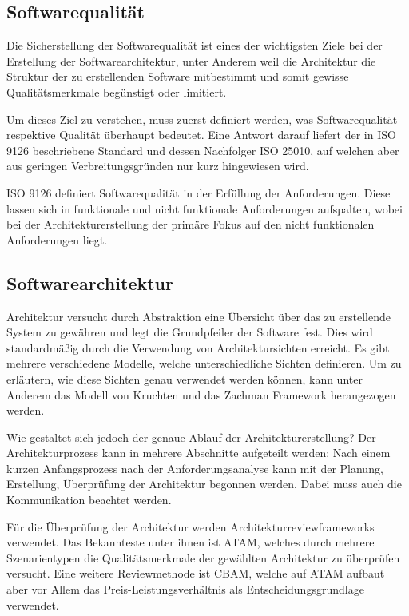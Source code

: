 \subsection{Softwarequalität}
Die Sicherstellung der Softwarequalität ist eines der wichtigsten Ziele bei der Erstellung der Softwarearchitektur, unter Anderem weil die Architektur die Struktur der zu erstellenden Software mitbestimmt und somit gewisse Qualitätsmerkmale begünstigt oder limitiert.

Um dieses Ziel zu verstehen, muss zuerst definiert werden, was Softwarequalität respektive Qualität überhaupt bedeutet. Eine Antwort darauf liefert der in ISO 9126 beschriebene Standard und dessen Nachfolger ISO 25010, auf welchen aber aus geringen Verbreitungsgründen nur kurz hingewiesen wird.

ISO 9126 definiert Softwarequalität in der Erfüllung der Anforderungen. Diese lassen sich in funktionale und nicht funktionale Anforderungen aufspalten, wobei bei der Architekturerstellung der primäre Fokus auf den nicht funktionalen Anforderungen liegt.

\subsection{Softwarearchitektur}
Architektur versucht durch Abstraktion eine Übersicht über das zu erstellende System zu gewähren und legt die Grundpfeiler der Software fest. Dies wird standardmäßig durch die Verwendung von Architektursichten erreicht. Es gibt mehrere verschiedene Modelle, welche unterschiedliche Sichten definieren. Um zu erläutern, wie diese Sichten genau verwendet werden können, kann unter Anderem das Modell von Kruchten und das Zachman Framework herangezogen werden.

Wie gestaltet sich jedoch der genaue Ablauf der Architekturerstellung? Der Architekturprozess kann in mehrere Abschnitte aufgeteilt werden: Nach einem kurzen Anfangsprozess nach der Anforderungsanalyse kann mit der Planung, Erstellung, Überprüfung der Architektur begonnen werden. Dabei muss auch die Kommunikation beachtet werden.

Für die Überprüfung der Architektur werden Architekturreviewframeworks verwendet. Das Bekannteste unter ihnen ist ATAM, welches durch mehrere Szenarientypen die Qualitätsmerkmale der gewählten Architektur zu überprüfen versucht. Eine weitere Reviewmethode ist CBAM, welche auf ATAM aufbaut aber vor Allem das Preis-Leistungsverhältnis als Entscheidungsgrundlage verwendet.

